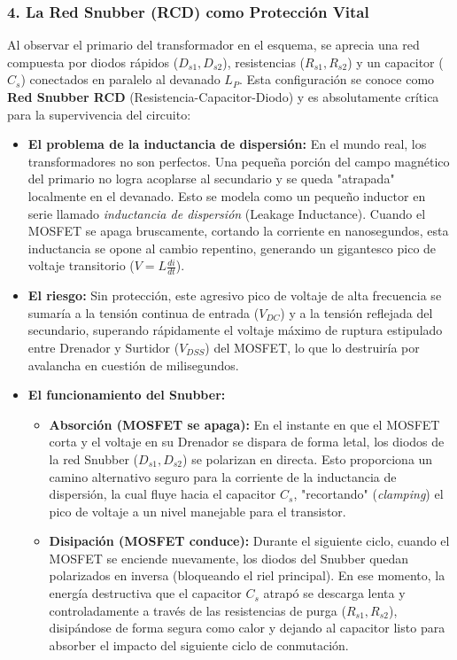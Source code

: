 \documentclass[12pt, a4paper]{article}
\begin{document}
\subsubsection*{4. La Red Snubber (RCD) como Protección Vital}
Al observar el primario del transformador en el esquema, se aprecia una red compuesta por diodos rápidos ($D_{s1}, D_{s2}$), resistencias ($R_{s1}, R_{s2}$) y un capacitor ($C_s$) conectados en paralelo al devanado $L_P$. Esta configuración se conoce como \textbf{Red Snubber RCD} (Resistencia-Capacitor-Diodo) y es absolutamente crítica para la supervivencia del circuito:
\begin{itemize}
    \item \textbf{El problema de la inductancia de dispersión:} En el mundo real, los transformadores no son perfectos. Una pequeña porción del campo magnético del primario no logra acoplarse al secundario y se queda "atrapada" localmente en el devanado. Esto se modela como un pequeño inductor en serie llamado \textit{inductancia de dispersión} (Leakage Inductance). Cuando el MOSFET se apaga bruscamente, cortando la corriente en nanosegundos, esta inductancia se opone al cambio repentino, generando un gigantesco pico de voltaje transitorio ($V = L \frac{di}{dt}$).
    \item \textbf{El riesgo:} Sin protección, este agresivo pico de voltaje de alta frecuencia se sumaría a la tensión continua de entrada ($V_{DC}$) y a la tensión reflejada del secundario, superando rápidamente el voltaje máximo de ruptura estipulado entre Drenador y Surtidor ($V_{DSS}$) del MOSFET, lo que lo destruiría por avalancha en cuestión de milisegundos.
    \item \textbf{El funcionamiento del Snubber:} 
    \begin{itemize}[itemsep=1ex, topsep=1ex]
        \item \textbf{Absorción (MOSFET se apaga):} En el instante en que el MOSFET corta y el voltaje en su Drenador se dispara de forma letal, los diodos de la red Snubber ($D_{s1}, D_{s2}$) se polarizan en directa. Esto proporciona un camino alternativo seguro para la corriente de la inductancia de dispersión, la cual fluye hacia el capacitor $C_s$, "recortando" (\textit{clamping}) el pico de voltaje a un nivel manejable para el transistor.
        \item \textbf{Disipación (MOSFET conduce):} Durante el siguiente ciclo, cuando el MOSFET se enciende nuevamente, los diodos del Snubber quedan polarizados en inversa (bloqueando el riel principal). En ese momento, la energía destructiva que el capacitor $C_s$ atrapó se descarga lenta y controladamente a través de las resistencias de purga ($R_{s1}, R_{s2}$), disipándose de forma segura como calor y dejando al capacitor listo para absorber el impacto del siguiente ciclo de conmutación.
    \end{itemize}
\end{itemize}
\end{document}
